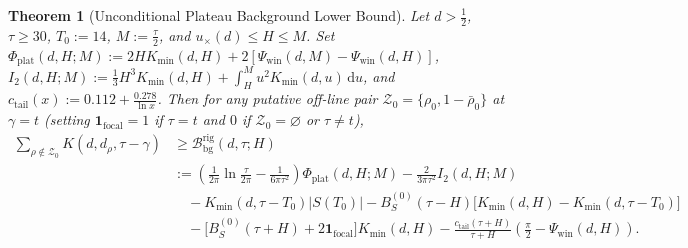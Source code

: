 \documentclass[11pt,reqno]{amsart}
\newtheorem{theorem}{Theorem}[section]
\theoremstyle{definition}
\theoremstyle{remark}
\numberwithin{equation}{section}
\newcommand{\dd}{\mathrm{d}}
\begin{document}
\begin{theorem}[Unconditional Plateau Background Lower Bound]\label{thm:rigorous_stieltjes}
Let $d > \frac{1}{2}$, $\tau \ge 30$, $T_0 := 14$, $M := \frac{\tau}{2}$, and $u_{\times}(d) \le H \le M$. Set $\Phi_{\mathrm{plat}}(d,H;M) := 2HK_{\min}(d,H) + 2[\Psi_{\mathrm{win}}(d,M) - \Psi_{\mathrm{win}}(d,H)]$, $I_{2}(d,H;M) := \frac{1}{3}H^3 K_{\min}(d,H) + \int_H^M u^2 K_{\min}(d,u)\,\dd u$, and $c_{\mathrm{tail}}(x) := 0.112 + \frac{0.278}{\ln x}$. Then for any putative off-line pair $\mathcal{Z}_0 = \{\rho_0, 1 - \bar{\rho}_0\}$ at $\gamma = t$ (setting $\mathbf{1}_{\mathrm{focal}} = 1$ if $\tau = t$ and $0$ if $\mathcal{Z}_0 = \varnothing$ or $\tau \ne t$),
\begin{align}\label{eq:rigorous_bg_bound}
\sum_{\rho \notin \mathcal{Z}_0} K(d, d_\rho, \tau - \gamma) &\ge \mathcal{B}_{\mathrm{bg}}^{\mathrm{rig}}(d, \tau; H) \nonumber\\
&:= \left(\frac{1}{2\pi}\ln\frac{\tau}{2\pi} - \frac{1}{6\pi\tau^2}\right)\Phi_{\mathrm{plat}}(d,H;M) - \frac{2}{3\pi\tau^2}I_2(d,H;M) \\
&\quad - K_{\min}(d,\tau - T_0)\lvert S(T_0)\rvert - B_S^{(0)}(\tau - H)\bigl[K_{\min}(d,H) - K_{\min}(d,\tau - T_0)\bigr] \nonumber\\
&\quad - \bigl[B_S^{(0)}(\tau + H) + 2\mathbf{1}_{\mathrm{focal}}\bigr]K_{\min}(d,H) - \frac{c_{\mathrm{tail}}(\tau + H)}{\tau + H}\left(\frac{\pi}{2} - \Psi_{\mathrm{win}}(d,H)\right).\nonumber
\end{align}
\end{theorem}
\end{document}
